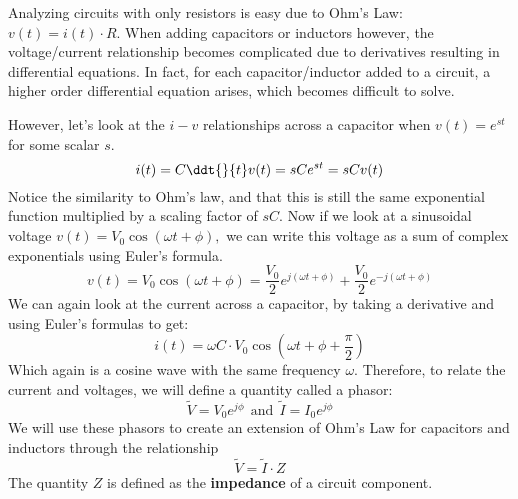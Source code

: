 

Analyzing circuits with only resistors is easy due to Ohm's Law: $v(t)=i(t) \cdot R$.
When adding capacitors or inductors however, the voltage/current relationship becomes complicated due to derivatives resulting in differential equations.
In fact, for each capacitor/inductor added to a circuit, a higher order differential equation arises, which becomes difficult to solve.

However, let's look at the $i-v$ relationships across a capacitor when $v(t) = e^{st}$ for some scalar $s.$
\begin{equation}
i(t) = C\ddt{}{t} v(t) = sC e^{st} = sC v(t)
\end{equation}
Notice the similarity to Ohm's law, and that this is still the same exponential function multiplied by a scaling factor of $sC.$ Now if we look at a sinusoidal voltage $v(t) = V_{0} \cos(\omega{} t+\phi{}),$ we can write this voltage as a sum of complex exponentials using Euler's formula.
\begin{equation}
v(t) = V_{0} \cos(\omega{} t+\phi{}) = \frac{V_{0}}{2} e^{j(\omega{} t + \phi{})} + \frac{V_{0}}{2} e^{-j(\omega{} t + \phi{})}
\end{equation}
We can again look at the current across a capacitor, by taking a derivative and using Euler's formulas to get:
\begin{equation}
i(t) = \omega C \cdot V_{0} \cos(\omega{} t + \phi{} + \frac{\pi}{2})
\end{equation}
Which again is a cosine wave with the same frequency $\omega.$ \vskip 0pt
Therefore, to relate the current and voltages, we will define a quantity called a phasor:
\begin{equation}
\widetilde{V} = V_{0} e^{j \phi{}} \ \  \text{and} \ \ \widetilde{I} =  I_{0} e^{j \phi{}}
\end{equation}
We will use these phasors to create an extension of Ohm's Law for capacitors and inductors through the relationship
\begin{equation}
\widetilde{V} = \widetilde{I} \cdot Z
\end{equation}
The quantity $Z$ is defined as the \textbf{impedance} of a circuit component.



